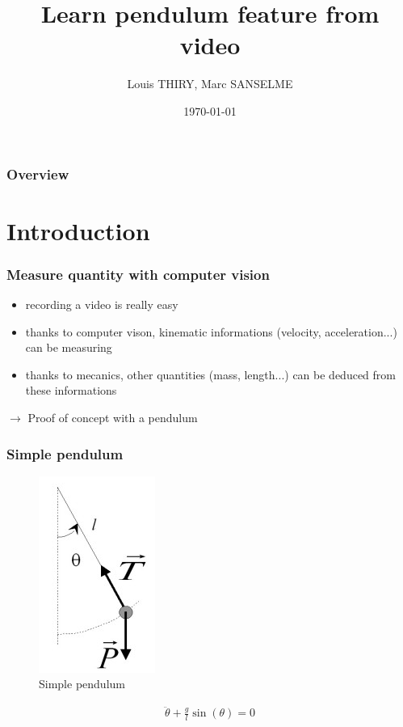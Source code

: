 \documentclass{beamer}
\title[Project Object Recognition]{Learn pendulum feature from video}
\author{Louis THIRY, Marc SANSELME}
\institute[MVA]
{ENS-Cachan}
\date{\today}
\begin{document}
\begin{frame}
\titlepage
\end{frame}

\begin{frame}
\frametitle{Overview}
\tableofcontents
\end{frame}


\section{Introduction}

\begin{frame}
\frametitle{Measure quantity with computer vision}
\begin{itemize}
  \item recording a video is really easy
  \item thanks to computer vison, kinematic informations (velocity, acceleration...) can be measuring
  \item thanks to mecanics, other quantities (mass, length...) can be deduced from these informations
\end{itemize}
$\rightarrow$ Proof of concept with a pendulum
\end{frame}

\begin{frame}
\frametitle{Simple pendulum}
\begin{figure}
  \includegraphics{pendule.jpg}
  \caption{Simple pendulum}
\end{figure}
\begin{align*}
  \ddot{\theta} + \frac{g}{l} \sin (\theta) = 0
\end{align*}
\end{frame}
\end{document}
